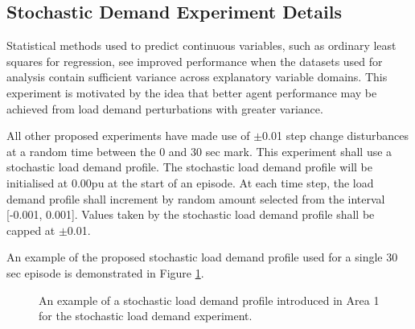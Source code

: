 \subsection{Stochastic Demand Experiment Details}\label{sec:stochastic}
Statistical methods used to predict continuous variables, such as ordinary least squares for regression, see improved performance when the datasets used for analysis contain sufficient variance across explanatory variable domains. This experiment is motivated by the idea that better agent performance may be achieved from load demand perturbations with greater variance.

All other proposed experiments have made use of $\pm$0.01 step change disturbances at a random time between the 0 and 30 sec mark. This experiment shall use a stochastic load demand profile. The stochastic load demand profile will be initialised at 0.00pu at the start of an episode. At each time step, the load demand profile shall increment by random amount selected from the interval [-0.001, 0.001]. Values taken by the stochastic load demand profile shall be capped at $\pm$0.01.

An example of the proposed stochastic load demand profile used for a single 30 sec episode is demonstrated in Figure \ref{fig:stochastic_signal}.

\begin{figure}[h]
	\centering
	
	\caption{An example of a stochastic load demand profile introduced in Area 1 for the stochastic load demand experiment.}\label{fig:stochastic_signal}
\end{figure}

